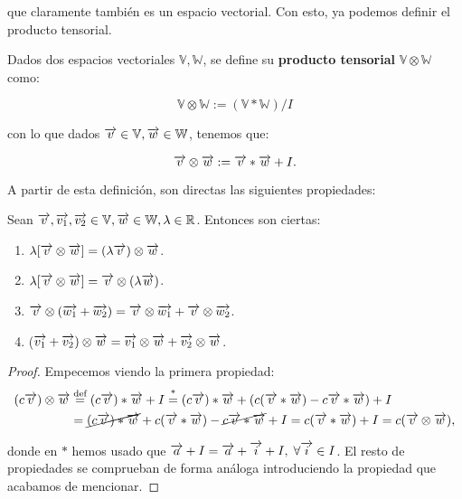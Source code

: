 que claramente también es un espacio vectorial. Con esto, ya podemos definir el producto tensorial.

\begin{definicion}
	Dados dos espacios vectoriales $\mathbb{V}, \mathbb{W}$, se define su \textbf{producto tensorial} $\mathbb{V} \otimes \mathbb{W}$ como:

	$$\mathbb{V} \otimes \mathbb{W} := (\mathbb{V} \ast \mathbb{W}) / I$$

	con lo que dados $\nv{v} \in \mathbb{V}, \nv{w} \in \mathbb{W}$, tenemos que:

	\begin{equation}
		\nv{v} \otimes \nv{w} := \nv{v} \ast \nv{w} + I.
	\end{equation}
\end{definicion}

A partir de esta definición, son directas las siguientes propiedades:

\begin{proposicion} \label{prop:tensores_propiedades}
	Sean $\nv{v}, \nv{v_1}, \nv{v_2} \in \mathbb{V}, \nv{w} \in \mathbb{W}, \lambda \in \R$. Entonces son ciertas:
	\begin{enumerate}
		\item $\lambda [\nv{v} \otimes \nv{w}] = (\lambda \nv{v}) \otimes \nv{w}$.
		\item $\lambda [\nv{v} \otimes \nv{w}] = \nv{v} \otimes (\lambda \nv{w})$.
		\item $\nv{v} \otimes (\nv{w_1} + \nv{w_2}) = \nv{v} \otimes \nv{w_1} + \nv{v} \otimes \nv{w_2}$.
		\item ($\nv{v_1} + \nv{v_2}) \otimes \nv{w} = \nv{v_1} \otimes \nv{w} + \nv{v_2} \otimes \nv{w}$.
	\end{enumerate}
\end{proposicion}

\begin{proof} Empecemos viendo la primera propiedad:
	\begin{equation}
		\begin{split}
			(c\nv{v}) \otimes \nv{w} &\eqtext{def} (c\nv{v}) \ast \nv{w} + I \encima{=}{\text{*}} (c\nv{v}) \ast \nv{w} + (c(\nv{v} \ast \nv{w}) - c\nv{v} \ast \nv{w}) + I \\
            &= \cancel{(c\nv{v}) \ast \nv{w}} + c(\nv{v} \ast \nv{w}) - \cancel{c\nv{v} \ast \nv{w}} + I = c(\nv{v} \ast \nv{w}) + I = c (\nv{v} \otimes \nv{w}),
		\end{split}
	\end{equation}

    donde en $\text{*}$ hemos usado que $\nv{a} + I = \nv{a} + \nv{i} + I, \; \forall \nv{i} \in I$. El resto de propiedades se comprueban de forma análoga introduciendo la propiedad que acabamos de mencionar.

\end{proof}

